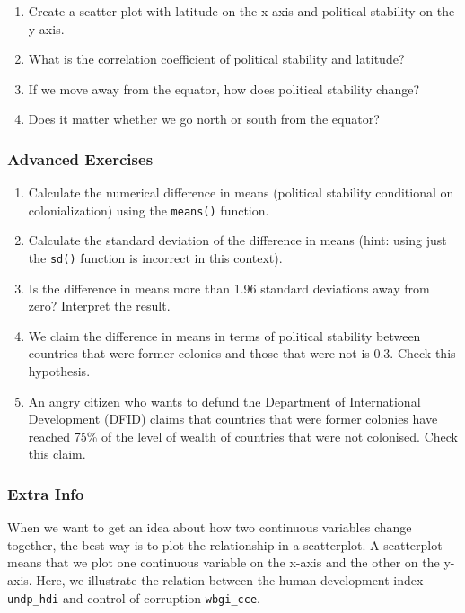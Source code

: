 \documentclass[]{article}
\providecommand{\tightlist}{%
  \setlength{\itemsep}{0pt}\setlength{\parskip}{0pt}}
\theoremstyle{definition}
\theoremstyle{definition}
\theoremstyle{definition}
\theoremstyle{remark}
\begin{document}
\begin{enumerate}
\def\labelenumi{\arabic{enumi}.}
\setcounter{enumi}{17}
\tightlist
\item
  Create a scatter plot with latitude on the x-axis and political
  stability on the y-axis.
\item
  What is the correlation coefficient of political stability and
  latitude?
\item
  If we move away from the equator, how does political stability change?
\item
  Does it matter whether we go north or south from the equator?
\end{enumerate}

\subsubsection{Advanced Exercises}\label{advanced-exercises}

\begin{enumerate}
\def\labelenumi{\arabic{enumi}.}
\setcounter{enumi}{21}
\tightlist
\item
  Calculate the numerical difference in means (political stability
  conditional on colonialization) using the \texttt{means()} function.
\item
  Calculate the standard deviation of the difference in means (hint:
  using just the \texttt{sd()} function is incorrect in this context).
\item
  Is the difference in means more than 1.96 standard deviations away
  from zero? Interpret the result.
\item
  We claim the difference in means in terms of political stability
  between countries that were former colonies and those that were not is
  0.3. Check this hypothesis.
\item
  An angry citizen who wants to defund the Department of International
  Development (DFID) claims that countries that were former colonies
  have reached 75\% of the level of wealth of countries that were not
  colonised. Check this claim.
\end{enumerate}

\subsubsection{Extra Info}\label{extra-info}

When we want to get an idea about how two continuous variables change
together, the best way is to plot the relationship in a scatterplot. A
scatterplot means that we plot one continuous variable on the x-axis and
the other on the y-axis. Here, we illustrate the relation between the
human development index \texttt{undp\_hdi} and control of corruption
\texttt{wbgi\_cce}.
\end{document}
